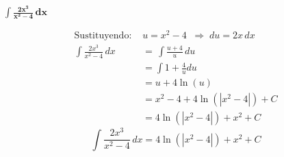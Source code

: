 $\displaystyle \mathbf{ \int 
        \frac{2x^{3}}{x^{2} - 4}
    \,dx}$ 

\begin{align*}
\text{Sustituyendo: } &u = x^{2} - 4 
\;\;\Rightarrow\; du = 2x\,dx\\[6pt]
\int \frac{2x^{3}}{x^{2} - 4}\,dx
&= \, \int \frac{u + 4}{u} \, du \\[6pt]
&= \int 1 + \frac{4}{u}du \\[6pt]
&= u + 4 \ln\left(u\right)\\[6pt]
&= x^{2} - 4 + 4 \ln\left(\left|x^{2} - 4\right|\right) + C\\[6pt]
&= 4 \ln\left(\left|x^{2} - 4\right|\right) + x^{2} + C
\end{align*}
\[
\boxed{\displaystyle 
    \int \frac{2x^{3}}{x^{2} - 4}\,dx 
    = 4 \ln\left(\left|x^{2} - 4\right|\right) + x^{2} + C
}
\]